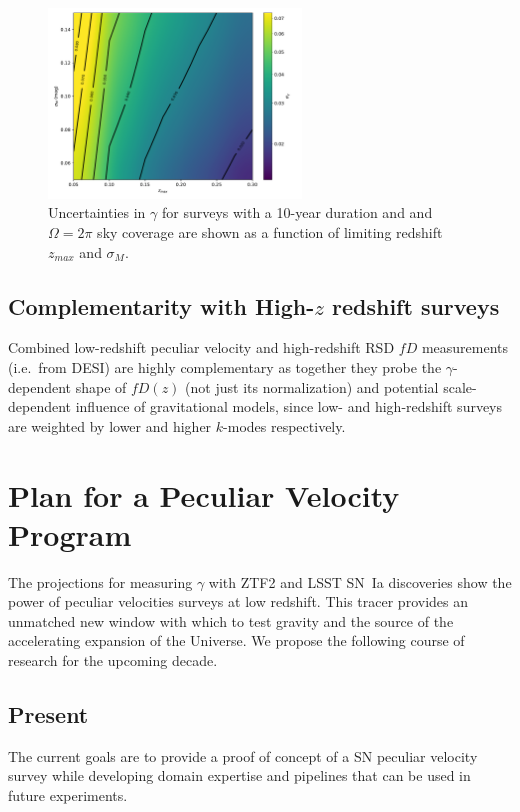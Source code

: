 \documentclass[11pt, oneside]{article}   	%
\begin{document}
\begin{figure}
\centering
\includegraphics[width=0.6\textwidth]{src/surface2.pdf}
\caption{Uncertainties in $\gamma$ for surveys with a 10-year duration and  and $\Omega=2\pi$ sky coverage 
are shown as a function of limiting  redshift $z_{max}$ and $\sigma_M$.
\label{lsst:fig}}
\end{figure}

\subsection{Complementarity with High-$z$ redshift surveys}
Combined low-redshift peculiar velocity and high-redshift RSD $fD$ measurements (i.e.\ from DESI) are highly complementary as together they probe the
$\gamma$-dependent shape of $fD(z)$ (not just its normalization) and potential scale-dependent influence of gravitational models, since low-
and high-redshift surveys are weighted by lower and higher $k$-modes respectively.

\section{Plan for a Peculiar Velocity Program}
The projections for measuring $\gamma$ with ZTF2 and LSST SN~Ia discoveries
show the power of peculiar velocities surveys at low redshift.
This  tracer provides an unmatched  new window with which to test gravity and the source of the accelerating expansion of the Universe.
We propose the following course of research for the upcoming decade.

\subsection{Present}
The current goals are to provide a proof of concept of a SN peculiar velocity survey while developing domain
expertise and pipelines that can be used in future experiments.
\end{document}
